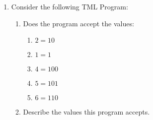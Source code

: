 \documentclass[answers]{exam}
\begin{document}
    \begin{enumerate}
        \item Consider the following TML Program:
        

        \begin{enumerate}
            \item Does the program accept the values:
            \begin{enumerate}
                \item $2 = 10$
                \begin{solution}
                    
                \end{solution}
                
                \item $1 = 1$
                \begin{solution}
                    
                \end{solution}
                
                \item $4 = 100$
                \begin{solution}
                    
                \end{solution}
                
                \item $5 = 101$
                \begin{solution}
                    
                \end{solution}
                
                \item $6 = 110$
                \begin{solution}
                    
                \end{solution}
            \end{enumerate}
            
            \item Describe the values this program accepts.
            \begin{solution}
                \vspace*{30pt}
            \end{solution}
        \end{enumerate}
        \newpage


\end{enumerate}
\end{document}

